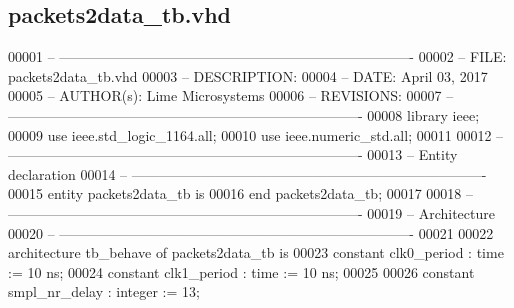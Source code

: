 \subsection{packets2data\+\_\+tb.\+vhd}
\label{packets2data__tb_8vhd_source}

\begin{DoxyCode}
00001 \textcolor{keyword}{-- ---------------------------------------------------------------------------- }
00002 \textcolor{keyword}{-- FILE:    packets2data\_tb.vhd}
00003 \textcolor{keyword}{-- DESCRIPTION: }
00004 \textcolor{keyword}{-- DATE:    April 03, 2017}
00005 \textcolor{keyword}{-- AUTHOR(s):   Lime Microsystems}
00006 \textcolor{keyword}{-- REVISIONS:}
00007 \textcolor{keyword}{-- ---------------------------------------------------------------------------- }
00008 \textcolor{vhdlkeyword}{library }\textcolor{keywordflow}{ieee};
00009 \textcolor{vhdlkeyword}{use }ieee.std\_logic\_1164.\textcolor{keywordflow}{all};
00010 \textcolor{vhdlkeyword}{use }ieee.numeric\_std.\textcolor{keywordflow}{all};
00011 
00012 \textcolor{keyword}{-- ----------------------------------------------------------------------------}
00013 \textcolor{keyword}{-- Entity declaration}
00014 \textcolor{keyword}{-- ----------------------------------------------------------------------------}
00015 \textcolor{keywordflow}{entity }packets2data_tb \textcolor{keywordflow}{is}
00016 \textcolor{keywordflow}{end} \textcolor{vhdlchar}{packets2data\_tb};
00017 
00018 \textcolor{keyword}{-- ----------------------------------------------------------------------------}
00019 \textcolor{keyword}{-- Architecture}
00020 \textcolor{keyword}{-- ----------------------------------------------------------------------------}
00021 
00022 \textcolor{keywordflow}{architecture} tb\_behave \textcolor{keywordflow}{of} packets2data_tb is
00023 \textcolor{keywordflow}{constant} \textcolor{vhdlchar}{clk0_period}    \textcolor{vhdlchar}{:} \textcolor{comment}{time} \textcolor{vhdlchar}{:=} \textcolor{vhdllogic}{}\textcolor{vhdllogic}{10} \textcolor{vhdlchar}{ns};
00024 \textcolor{keywordflow}{constant} \textcolor{vhdlchar}{clk1_period}    \textcolor{vhdlchar}{:} \textcolor{comment}{time} \textcolor{vhdlchar}{:=} \textcolor{vhdllogic}{}\textcolor{vhdllogic}{10} \textcolor{vhdlchar}{ns}; 
00025 
00026 \textcolor{keywordflow}{constant} \textcolor{vhdlchar}{smpl_nr_delay}  \textcolor{vhdlchar}{:} \textcolor{comment}{integer} \textcolor{vhdlchar}{:=} \textcolor{vhdllogic}{}\textcolor{vhdllogic}{13};

\end{DoxyCode}
